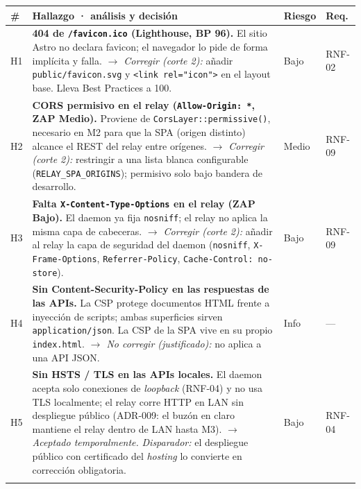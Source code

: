 \documentclass[11pt]{article}
\begin{document}
\medskip
\noindent\footnotesize
\begin{tabularx}{\linewidth}{@{}p{0.6cm} X l l@{}}
\toprule
\textbf{\#} & \textbf{Hallazgo · análisis y decisión} & \textbf{Riesgo} & \textbf{Req.} \\
\midrule

H1 & \textbf{404 de \texttt{/favicon.ico} (Lighthouse, BP 96).} El sitio Astro no
declara favicon; el navegador lo pide de forma implícita y falla.
\newline\textit{$\rightarrow$ Corregir (corte 2):} añadir \texttt{public/favicon.svg}
y \texttt{<link rel="icon">} en el layout base. Lleva Best Practices a 100. &
Bajo & RNF-02 \\
\addlinespace

H2 & \textbf{CORS permisivo en el relay (\texttt{Allow-Origin: *}, ZAP Medio).}
Proviene de \texttt{CorsLayer::permissive()}, necesario en M2 para que la SPA
(origen distinto) alcance el REST del relay entre orígenes.
\newline\textit{$\rightarrow$ Corregir (corte 2):} restringir a una lista blanca
configurable (\texttt{RELAY\_SPA\_ORIGINS}); permisivo solo bajo bandera de
desarrollo. &
Medio & RNF-09 \\
\addlinespace

H3 & \textbf{Falta \texttt{X-Content-Type-Options} en el relay (ZAP Bajo).} El
daemon ya fija \texttt{nosniff}; el relay no aplica la misma capa de cabeceras.
\newline\textit{$\rightarrow$ Corregir (corte 2):} añadir al relay la capa de
seguridad del daemon (\texttt{nosniff}, \texttt{X-Frame-Options},
\texttt{Referrer-Policy}, \texttt{Cache-Control: no-store}). &
Bajo & RNF-09 \\
\addlinespace

H4 & \textbf{Sin Content-Security-Policy en las respuestas de las APIs.} La CSP
protege documentos HTML frente a inyección de scripts; ambas superficies sirven
\texttt{application/json}. La CSP de la SPA vive en su propio \texttt{index.html}.
\newline\textit{$\rightarrow$ No corregir (justificado):} no aplica a una API JSON. &
Info & --- \\
\addlinespace

H5 & \textbf{Sin HSTS / TLS en las APIs locales.} El daemon acepta solo conexiones
de \emph{loopback} (RNF-04) y no usa TLS localmente; el relay corre HTTP en LAN
sin despliegue público (ADR-009: el buzón en claro mantiene el relay dentro de
LAN hasta M3).
\newline\textit{$\rightarrow$ Aceptado temporalmente.} \textit{Disparador:} el
despliegue público con certificado del \emph{hosting} lo convierte en corrección
obligatoria. &
Bajo & RNF-04 \\
\addlinespace


\end{tabularx}
\end{document}
